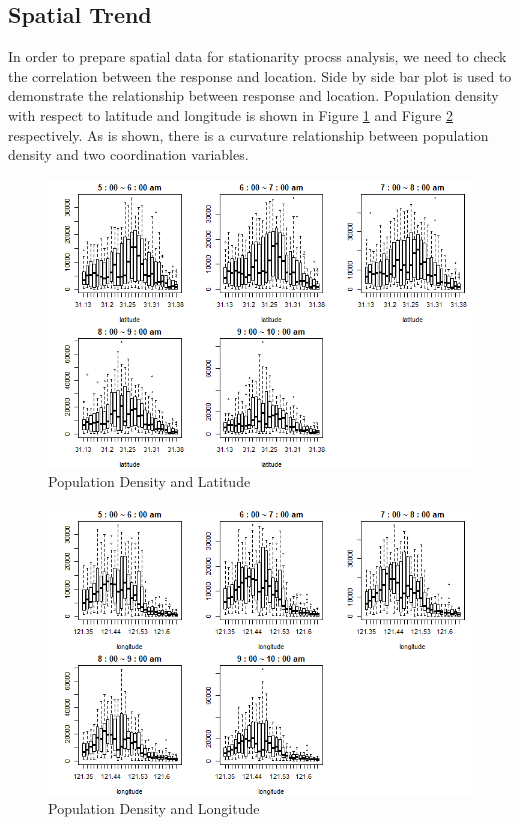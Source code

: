 \documentclass[hidelinks,12pt]{article}
\begin{document}
	\subsection{Spatial Trend}\label{sec:spatialtrend}
	
	In order to prepare spatial data for stationarity procss analysis, we need to check the correlation between the response and location. Side by side bar plot is used to demonstrate the relationship between response and location. Population density with respect to latitude and longitude is shown in Figure \ref{fig:lat} and Figure \ref{fig:long} respectively. As is shown, there is a curvature relationship between population density and two coordination variables. 
	
	\begin{figure}[!ht]
		\includegraphics[width=\textwidth]{lat.png}
		\caption{Population Density and Latitude\label{fig:lat}}
	\end{figure}
	\FloatBarrier
	
	\begin{figure}[!ht]
		\includegraphics[width=\textwidth]{long.png}
		\caption{Population Density and Longitude\label{fig:long}}
	\end{figure}
	\FloatBarrier
	
\end{document}
